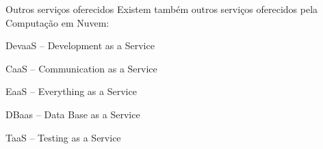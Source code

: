\begin{frame}{Outros serviços oferecidos}
    Existem também outros serviços oferecidos pela Computação em Nuvem:
    \begin{itemise}
        \item<2-> DevaaS -- Development as a Service
        \item<3-> CaaS -- Communication as a Service
        \item<4-> EaaS -- Everything as a Service
        \item<5-> DBaas -- Data Base as a Service
        \item<6-> TaaS -- Testing as a Service
    \end{itemise}
\end{frame}
